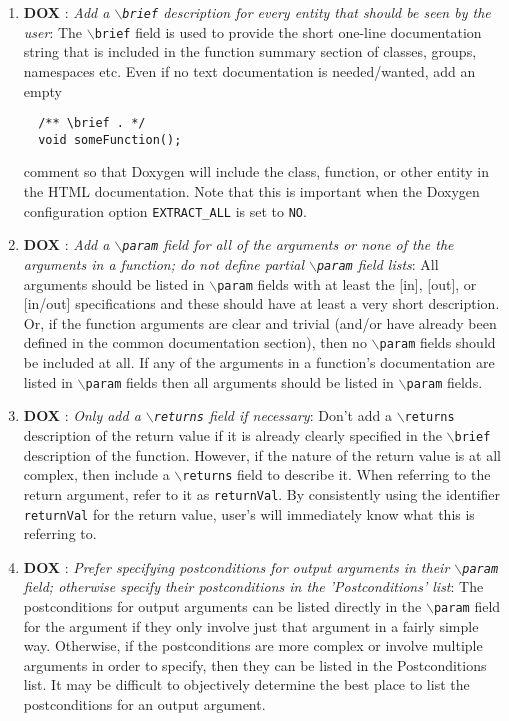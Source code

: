 \begin{enumerate}
{}\item{}\textbf{DOX }:
{}\textit{Add a {}\texttt{$\backslash$brief} description for every entity
that should be seen by the user}: The {}\texttt{$\backslash$brief} field is
used to provide the short one-line documentation string that is included in
the function summary section of classes, groups, namespaces etc.  Even if no
text documentation is needed/wanted, add an empty
%
{\small\begin{verbatim}
  /** \brief . */
  void someFunction();
\end{verbatim}}
%
comment so that Doxygen will include the class, function, or other entity in
the HTML documentation.  Note that this is important when the Doxygen
configuration option {}\texttt{EXTRACT\-\_ALL} is set to {}\texttt{NO}.

{}\item{}\textbf{DOX }:
{}\textit{Add a {}\texttt{$\backslash$param} field for all of the
arguments or none of the the arguments in a function; do not define partial
{}\texttt{$\backslash$param} field lists}: All arguments should be listed in
{}\texttt{$\backslash$param} fields with at least the [in], [out], or [in/out]
specifications and these should have at least a very short description.  Or,
if the function arguments are clear and trivial (and/or have already been
defined in the common documentation section), then no
{}\texttt{$\backslash$param} fields should be included at all.  If any of the
arguments in a function's documentation are listed in
{}\texttt{$\backslash$param} fields then all arguments should be listed in
{}\texttt{$\backslash$param} fields.

{}\item{}\textbf{DOX }:
{}\textit{Only add a {}\texttt{$\backslash$returns} field if necessary}:
Don't add a {}\texttt{$\backslash$returns} description of the return value if
it is already clearly specified in the {}\texttt{$\backslash$brief}
description of the function.  However, if the nature of the return value is at
all complex, then include a {}\texttt{$\backslash$returns} field to describe
it.  When referring to the return argument, refer to it as
{}\texttt{returnVal}.  By consistently using the identifier
{}\texttt{returnVal} for the return value, user's will immediately know what
this is referring to.

{}\item{}\textbf{DOX }:
{}\textit{Prefer specifying postconditions for output arguments in their
{}\texttt{$\backslash$param} field; otherwise specify their postconditions in
the 'Postconditions' list}: The postconditions for output arguments can be
listed directly in the {}\texttt{$\backslash$param} field for the argument if
they only involve just that argument in a fairly simple way.  Otherwise, if
the postconditions are more complex or involve multiple arguments in order to
specify, then they can be listed in the Postconditions list.  It may be
difficult to objectively determine the best place to list the postconditions
for an output argument.


\end{enumerate}

